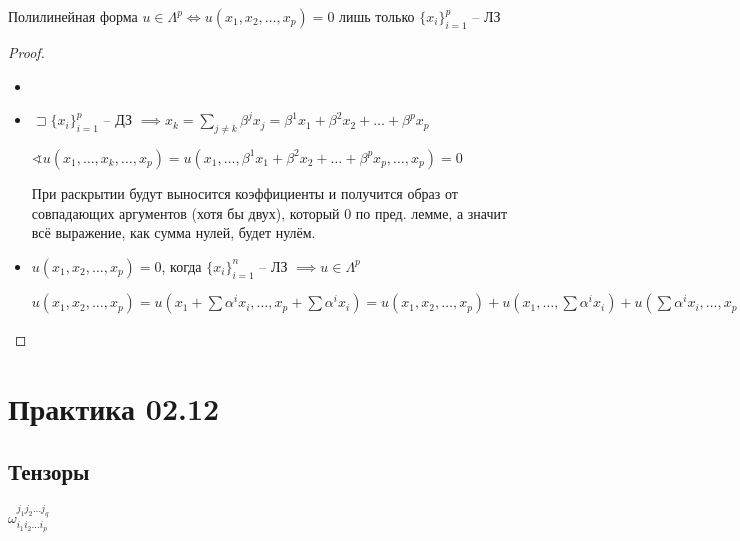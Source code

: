 \documentclass{book}
\theoremstyle{definition}
\begin{document}
    \begin{lemma}
        Полилинейная форма $u\in \Lambda^p \iff u\left( x_1, x_2, \ldots, x_p \right) =0$ лишь только $\{x_i\}_{i=1}^p$ -- ЛЗ
    \end{lemma}
    \begin{proof}
        \begin{itemize}
            \item []
            \item [$\implies$] $\sqsupset \{x_i\}_{i=1}^p$ -- ДЗ $\implies x_k = \sum_{j\neq k}\beta^jx_j = \beta^1x_1 + \beta^2x_2 + \ldots + \beta^p x_p$

                $\sphericalangle u\left( x_1, \ldots, x_k, \ldots, x_p \right) = u\left( x_1, \ldots, \beta^1x_1+\beta^2x_2+\ldots+\beta^px_p, \ldots, x_p \right) = 0 $ 

                При раскрытии будут выносится коэффициенты и получится образ от совпадающих аргументов (хотя бы двух), который 0 по пред. лемме, а значит всё выражение, как сумма нулей, будет нулём.
            \item [$\impliedby $] $u\left( x_1, x_2, \ldots, x_p \right) = 0 $, когда $\{x_i\}_{i=1}^n$ -- ЛЗ  $\implies u\in \Lambda^p$

                $u\left( x_1, x_2, \ldots, x_p \right) = u\left( x_1 + \sum \alpha^ix_i, \ldots, x_p+\sum \alpha^ix_i \right)  = u(x_1, x_2, \ldots, x_p) + u\left( x_1, \ldots, \sum \alpha^ix_i \right) + u\left( \sum \alpha^ix_i, \ldots, x_p \right) = u\left(x_1, x_2, \ldots, x_p  \right)  + \sum_{j=2}^{p} \alpha^iu\left( x_1, \ldots, x_i \right) + \sum_{i=1}^{p-1} \alpha^iu(x_i, \ldots, x_p) $
        \end{itemize}
    \end{proof}

        \section{Практика 02.12}

        \subsection{Тензоры}

        $\omega_{i_1 i_2 \ldots i_p}^{j_1 j_2 \ldots j_q}$
\end{document}
